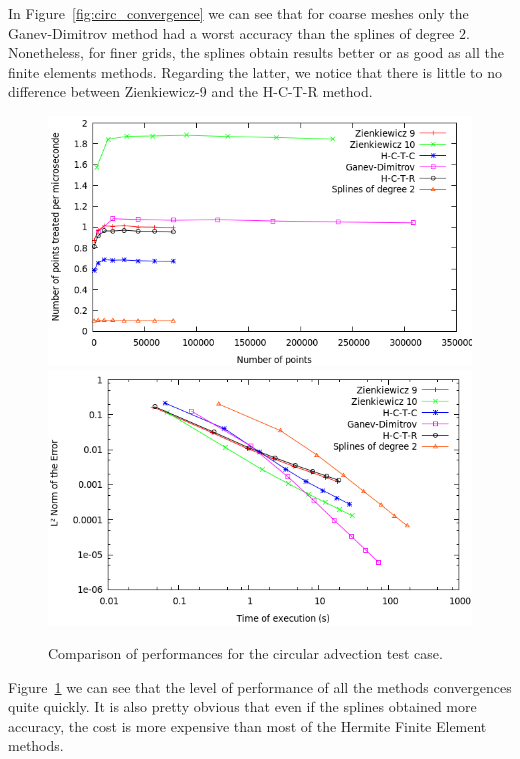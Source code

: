 \documentclass[proc]{edpsmath}
\begin{document}
In Figure~\ref{fig:circ_convergence} we can see that for coarse meshes only the Ganev-Dimitrov method had a worst accuracy than the splines of degree $2$. Nonetheless, for finer grids, the splines obtain results better or as good as all the finite elements methods. Regarding the latter, we notice that there is little to no difference between Zienkiewicz-9 and the H-C-T-R method. 

\begin{figure}[h!]
	\includegraphics[scale=0.35]{figures/efficiency.png}
	\includegraphics[scale=0.35]{figures/time_norm.png}
	\caption{Comparison of performances for the circular advection test case.}
	\label{fig:circ_performance}
\end{figure}

Figure~\ref{fig:circ_performance} we can see that the level of performance of all the methods convergences quite quickly. It is also pretty obvious that even if the splines obtained more accuracy, the cost is more expensive than most of the Hermite Finite Element methods.
\end{document}
